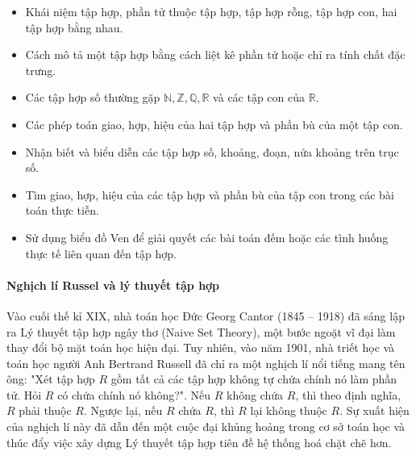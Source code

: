 \begin{emdahoc}
	\begin{itemize}
		\item Khái niệm tập hợp, phần tử thuộc tập hợp, tập hợp rỗng, tập hợp con, hai tập hợp bằng nhau.
		\item Cách mô tả một tập hợp bằng cách liệt kê phần tử hoặc chỉ ra tính chất đặc trưng.
		\item Các tập hợp số thường gặp $\mathbb{N}, \mathbb{Z}, \mathbb{Q}, \mathbb{R}$ và các tập con của $\mathbb{R}$.
		\item Các phép toán giao, hợp, hiệu của hai tập hợp và phần bù của một tập con.
	\end{itemize}
\end{emdahoc}

\begin{emcothe}
	\begin{itemize}
		\item Nhận biết và biểu diễn các tập hợp số, khoảng, đoạn, nửa khoảng trên trục số.
		\item Tìm giao, hợp, hiệu của các tập hợp và phần bù của tập con trong các bài toán thực tiễn.
		\item Sử dụng biểu đồ Ven để giải quyết các bài toán đếm hoặc các tình huống thực tế liên quan đến tập hợp.
	\end{itemize}
\end{emcothe}

\begin{emcobiet}
	\paragraph{Nghịch lí Russel và lý thuyết tập hợp}
	Vào cuối thế kỉ XIX, nhà toán học Đức Georg Cantor (1845 – 1918) đã sáng lập ra Lý thuyết tập hợp ngây thơ (Naive Set Theory), một bước ngoặt vĩ đại làm thay đổi bộ mặt toán học hiện đại. Tuy nhiên, vào năm 1901, nhà triết học và toán học người Anh Bertrand Russell đã chỉ ra một nghịch lí nổi tiếng mang tên ông: "Xét tập hợp $R$ gồm tất cả các tập hợp không tự chứa chính nó làm phần tử. Hỏi $R$ có chứa chính nó không?". Nếu $R$ không chứa $R$, thì theo định nghĩa, $R$ phải thuộc $R$. Ngược lại, nếu $R$ chứa $R$, thì $R$ lại không thuộc $R$. Sự xuất hiện của nghịch lí này đã dẫn đến một cuộc đại khủng hoảng trong cơ sở toán học và thúc đẩy việc xây dựng Lý thuyết tập hợp tiên đề hệ thống hoá chặt chẽ hơn.
\end{emcobiet}
